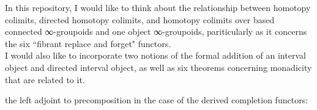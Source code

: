 \documentclass{book}
\theoremstyle{definition}
\begin{document}

In this repository, I would like to think about the relationship between homotopy colimits, directed homotopy colimits, and homotopy colimits over based connected ∞-groupoids and one object ∞-groupoids, pariticularly as it concerns the six ``fibrant replace and forget" functors.\\

I would also like to incorporate two notions of the formal addition of an interval object and directed interval object, as well as six theorems concerning monadicity that are related to it.\\

\iffalse

 the left adjoint to precomposition in the case of the derived completion functors:
\end{document}
